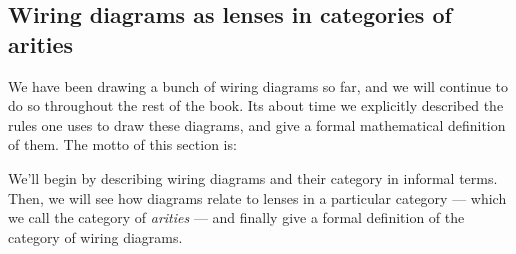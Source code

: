 \documentclass[DynamicalBook]{subfiles}
\begin{document}
\subsection{Wiring diagrams as lenses in categories of arities}


We have been drawing a bunch of wiring diagrams so far, and we will continue to
do so throughout the rest of the book. Its about time we explicitly described
the rules one uses to draw these diagrams, and give a formal mathematical
definition of them. The motto of this section is:

We'll begin by describing wiring diagrams and their category in informal terms.
Then, we will see how diagrams relate to lenses in a particular category --- which we call the
category of \emph{arities} --- and finally give a formal definition of the
category of wiring diagrams.
\end{document}
